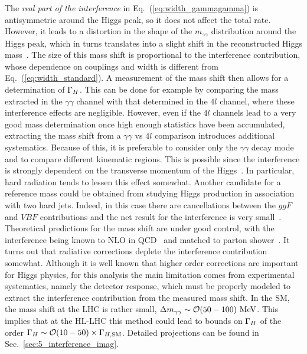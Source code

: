 The \emph{real part of the interference} in
Eq.~(\ref{eq:width_gammagamma}) is antisymmetric around the Higgs peak,
so it does not affect the total rate. However, it leads to a
distortion in the shape of the $m_{\gamma\gamma}$ distribution around
the Higgs peak, which in turns translates into a slight shift in the
reconstructed Higgs mass~\cite{Martin:2012xc}.  The size of this mass
shift is proportional to the interference contribution, whose
dependence on couplings and width is different from
Eq.~(\ref{eq:width_standard}). A measurement of the mass shift then
allows for a determination of ${\Gamma_H}$. This can be done for example by
comparing the mass extracted in the $\gamma\gamma$ channel with that
determined in the $4l$ channel, where these interference effects are negligible. However,
even if the $4l$ channels lead to a very good mass determination
once high enough statistics  have been accumulated, extracting the
mass shift from a $\gamma\gamma$ vs $4l$ comparison introduces
additional systematics. Because of this, it is preferable to
consider only the  $\gamma\gamma$ decay mode and to compare different kinematic regions.
This is possible since the interference
is strongly dependent on the transverse momentum of the Higgs~\cite{Dixon:2013haa}. 
In particular, hard radiation tends to lessen this effect somewhat.
Another candidate for a reference mass could be obtained from studying Higgs production
in association with two hard jets. Indeed, in this case there are
cancellations between the $ggF$ and $VBF$ contributions and the net result
for the interference is very small~\cite{Coradeschi:2015tna}. Theoretical predictions for
the mass shift are under good control, with the interference being
known to NLO in QCD~\cite{Dixon:2013haa,deFlorian:2013psa,Martin:2013ula} 
and matched to parton shower~\cite{Gleisberg:2008ta,Hoche:2015sya}. It turns
out that radiative corrections deplete the interference contribution somewhat.
Although it is well known that higher order corrections are important for 
Higgs physics, for this analysis the main limitation comes from experimental
systematics, namely the detector response, which must be properly modeled
to   extract the interference contribution from the measured mass shift. 
In the SM, the mass shift at the LHC is rather small, 
$\Delta m_{\gamma\gamma}\sim\mathcal O(50-100)~{\rm MeV}$. This implies that
at the HL-LHC this method could lead to bounds on ${\Gamma_H}$ of the order 
${\Gamma_H} \sim \mathcal O(10-50)\times {\Gamma_{H,{\rm SM}}}$. Detailed projections can be found in Sec.~\ref{sec:5_interference_imag}.

